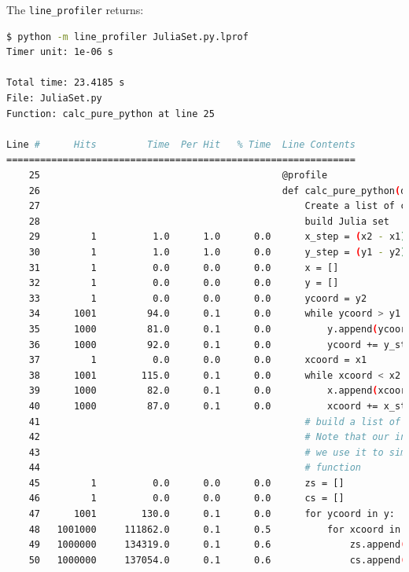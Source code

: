 \documentclass[a4paper,12pt]{article}
\begin{document}
The \verb|line_profiler| returns:
\begin{lstlisting}[language=bash,basicstyle=\tiny\ttfamily]
$ python -m line_profiler JuliaSet.py.lprof
Timer unit: 1e-06 s

Total time: 23.4185 s
File: JuliaSet.py
Function: calc_pure_python at line 25

Line #      Hits         Time  Per Hit   % Time  Line Contents
==============================================================
    25                                           @profile
    26                                           def calc_pure_python(desired_width, max_iterations):
    27                                               Create a list of complex coordinates (zs) and complex parameters (cs),
    28                                               build Julia set
    29         1          1.0      1.0      0.0      x_step = (x2 - x1) / desired_width
    30         1          1.0      1.0      0.0      y_step = (y1 - y2) / desired_width
    31         1          0.0      0.0      0.0      x = []
    32         1          0.0      0.0      0.0      y = []
    33         1          0.0      0.0      0.0      ycoord = y2
    34      1001         94.0      0.1      0.0      while ycoord > y1:
    35      1000         81.0      0.1      0.0          y.append(ycoord)
    36      1000         92.0      0.1      0.0          ycoord += y_step
    37         1          0.0      0.0      0.0      xcoord = x1
    38      1001        115.0      0.1      0.0      while xcoord < x2:
    39      1000         82.0      0.1      0.0          x.append(xcoord)
    40      1000         87.0      0.1      0.0          xcoord += x_step
    41                                               # build a list of coordinates and the initial condition for each cell.
    42                                               # Note that our initial condition is a constant and could easily be removed,
    43                                               # we use it to simulate a real-world scenario with several inputs to our
    44                                               # function
    45         1          0.0      0.0      0.0      zs = []
    46         1          0.0      0.0      0.0      cs = []
    47      1001        130.0      0.1      0.0      for ycoord in y:
    48   1001000     111862.0      0.1      0.5          for xcoord in x:
    49   1000000     134319.0      0.1      0.6              zs.append(complex(xcoord, ycoord))
    50   1000000     137054.0      0.1      0.6              cs.append(complex(c_real, c_imag))

\end{lstlisting}
\end{document}
